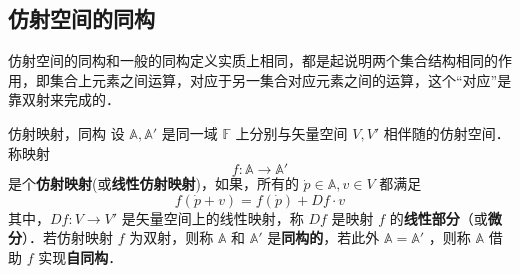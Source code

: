 \subsection{仿射空间的同构}
仿射空间的同构和一般的同构定义实质上相同，都是起说明两个集合结构相同的作用，即集合上元素之间运算，对应于另一集合对应元素之间的运算，这个“对应”是靠双射来完成的．
\begin{definition}{仿射映射，同构}\label{AfSp_def2}
设 $\mathbb A,\mathbb A'$ 是同一域 $\mathbb F$ 上分别与矢量空间 $V,V'$ 相伴随的仿射空间．称映射 
\begin{equation}
f:\mathbb A\rightarrow\mathbb A' 
\end{equation}
是个\textbf{仿射映射}(或\textbf{线性仿射映射})，如果，所有的 $\dot p\in \mathbb A,v\in V$ 都满足
\begin{equation}
f(\dot p+v)=f(\dot p)+Df\cdot v
\end{equation}
 其中，$Df:V\rightarrow V'$ 是矢量空间上的线性映射，称 $Df$ 是映射 $f$ 的\textbf{线性部分}（或\textbf{微分}）．若仿射映射 $f$ 为双射，则称 $\mathbb A$ 和 $\mathbb A'$ 是\textbf{同构的}，若此外 $\mathbb A=\mathbb A'$ ，则称 $\mathbb A$ 借助 $f$ 实现\textbf{自同构}．
\end{definition}


